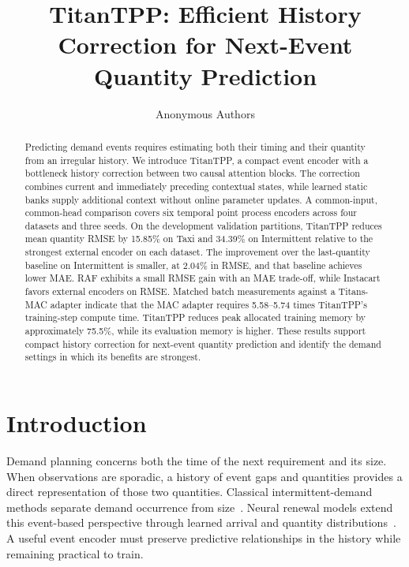 \documentclass[runningheads]{llncs}
\begin{document}
\title{TitanTPP: Efficient History Correction for Next-Event Quantity Prediction}
\author{Anonymous Authors}
\maketitle

\begin{abstract}
Predicting demand events requires estimating both their timing and their
quantity from an irregular history. We introduce TitanTPP, a compact event
encoder with a bottleneck history correction between two causal attention
blocks. The correction combines current and immediately preceding contextual
states, while learned static banks supply additional context without online
parameter updates. A common-input, common-head comparison covers six temporal
point process encoders across four datasets and three seeds. On the development
validation partitions, TitanTPP reduces mean quantity RMSE by 15.85\% on Taxi
and 34.39\% on Intermittent relative to the strongest external encoder on each
dataset. The improvement over the last-quantity baseline on Intermittent is
smaller, at 2.04\% in RMSE, and that baseline achieves lower MAE. RAF exhibits
a small RMSE gain with an MAE trade-off, while Instacart favors external
encoders on RMSE. Matched batch measurements against a Titans-MAC adapter
indicate that the MAC adapter requires 5.58--5.74 times TitanTPP's
training-step compute time. TitanTPP reduces peak allocated training memory by
approximately 75.5\%, while its evaluation memory is higher. These results support compact history correction for next-event
quantity prediction and identify the demand settings in which its benefits
are strongest.
\end{abstract}

\section{Introduction}
Demand planning concerns both the time of the next requirement and its size.
When observations are sporadic, a history of event gaps and quantities provides
a direct representation of those two quantities. Classical intermittent-demand
methods separate demand occurrence from size~\cite{croston1972forecasting}.
Neural renewal models extend this event-based perspective through learned
arrival and quantity distributions~\cite{turkmen2021renewal}. A useful event
encoder must preserve predictive relationships in the history while remaining
practical to train.
\end{document}
